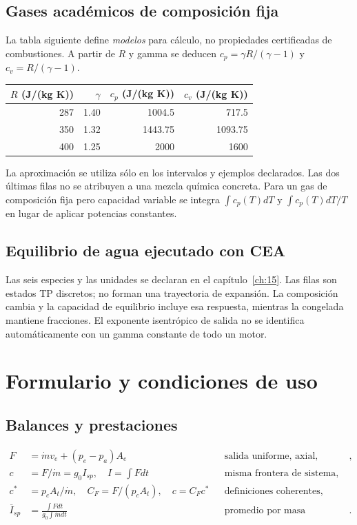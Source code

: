 \section{Gases académicos de composición fija}
La tabla siguiente define \emph{modelos} para cálculo, no propiedades certificadas de combustiones. A partir de $R$ y gamma se deducen $c_p=\gamma R/(\gamma-1)$ y $c_v=R/(\gamma-1)$.
\begin{center}\begin{tabular}{rrrr}\toprule
$R$ (J/(kg K)) & $\gamma$ & $c_p$ (J/(kg K)) & $c_v$ (J/(kg K))\\\midrule
287 & 1.40 & 1004.5 & 717.5\\
350 & 1.32 & 1443.75 & 1093.75\\
400 & 1.25 & 2000 & 1600\\\bottomrule\end{tabular}\end{center}
La aproximación se utiliza sólo en los intervalos y ejemplos declarados. Las dos últimas filas no se atribuyen a una mezcla química concreta. Para un gas de composición fija pero capacidad variable se integra $\int c_p(T)dT$ y $\int c_p(T)dT/T$ en lugar de aplicar potencias constantes.
\section{Equilibrio de agua ejecutado con CEA}

Las seis especies y las unidades se declaran en el capítulo~\ref{ch:15}. Las filas son estados TP discretos; no forman una trayectoria de expansión. La composición cambia y la capacidad de equilibrio incluye esa respuesta, mientras la congelada mantiene fracciones. El exponente isentrópico de salida no se identifica automáticamente con un gamma constante de todo un motor.
\chapter{Formulario y condiciones de uso}\label{app:formula}
\section{Balances y prestaciones}
\begin{align*}
 F&=\dot mv_e+(p_e-p_a)A_e &&\text{salida uniforme, axial, estacionaria},\\
 c&=F/\dot m=g_0I_{sp},\quad I=\int Fdt &&\text{misma frontera de sistema},\\
 c^*&=p_cA_t/\dot m,\quad C_F=F/(p_cA_t),\quad c=C_Fc^* &&\text{definiciones coherentes},\\
 \overline I_{sp}&=\frac{\int Fdt}{g_0\int\dot mdt} &&\text{promedio por masa consumida}.
\end{align*}
